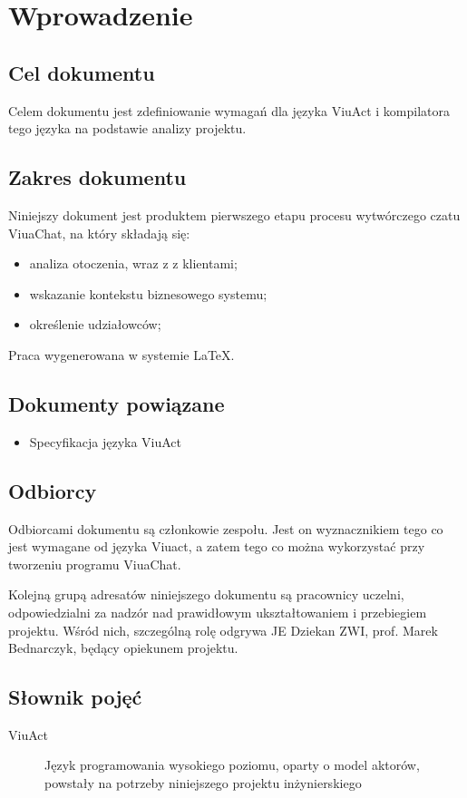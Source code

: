 \section{Wprowadzenie}

\subsection{Cel dokumentu}
Celem dokumentu jest zdefiniowanie wymagań dla języka ViuAct i kompilatora tego języka na podstawie analizy projektu.

\subsection{Zakres dokumentu}
Niniejszy dokument jest produktem pierwszego etapu procesu wytwórczego czatu ViuaChat, na który składają się:
\begin{itemize}
    \item analiza otoczenia, wraz z z klientami;
    \item wskazanie kontekstu biznesowego systemu;
    \item określenie udziałowców;
\end{itemize}

Praca wygenerowana w systemie \LaTeX.

\subsection{Dokumenty powiązane}
\begin{itemize}
	\item Specyfikacja języka ViuAct
\end{itemize}

\subsection{Odbiorcy}

Odbiorcami dokumentu są członkowie zespołu.
Jest on wyznacznikiem tego co jest wymagane od języka Viuact, a zatem tego co można wykorzystać przy tworzeniu
programu ViuaChat.

Kolejną grupą adresatów niniejszego dokumentu są pracownicy uczelni, odpowiedzialni za nadzór nad prawidłowym ukształtowaniem i przebiegiem projektu.
Wśród nich, szczególną rolę odgrywa JE Dziekan ZWI, prof. Marek Bednarczyk, będący opiekunem projektu.

\subsection{Słownik pojęć}
\begin{description}
  \item[ViuAct] Język programowania wysokiego poziomu, oparty o model aktorów, powstały na potrzeby niniejszego projektu inżynierskiego
\end{description}

